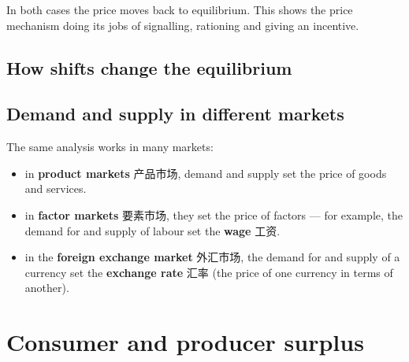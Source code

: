 \documentclass[11pt]{article}
\begin{document}
In both cases the price moves back to equilibrium. This shows the price mechanism doing its jobs of signalling, rationing and giving an incentive.

\subsection*{How shifts change the equilibrium}

\begin{center}
\end{center}

\subsection*{Demand and supply in different markets}

The same analysis works in many markets:

\begin{itemize}
\item in \textbf{product markets} 产品市场, demand and supply set the price of goods and services.

\item in \textbf{factor markets} 要素市场, they set the price of factors — for example, the demand for and supply of labour set the \textbf{wage} 工资.

\item in the \textbf{foreign exchange market} 外汇市场, the demand for and supply of a currency set the \textbf{exchange rate} 汇率 (the price of one currency in terms of another).

\end{itemize}

\section*{Consumer and producer surplus}
\end{document}
